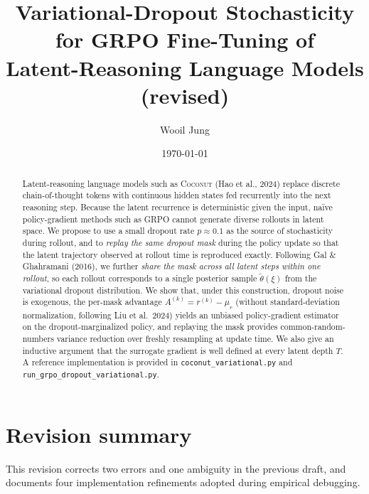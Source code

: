 \documentclass[11pt]{article}
\title{Variational-Dropout Stochasticity for GRPO Fine-Tuning of \\
       Latent-Reasoning Language Models \\[4pt]
       \large (revised)}
\author{Wooil Jung}
\date{\today}
\theoremstyle{definition}
\theoremstyle{remark}
\begin{document}
\maketitle

\begin{abstract}
Latent-reasoning language models such as \textsc{Coconut} (Hao et al., 2024)
replace discrete chain-of-thought tokens with continuous hidden states fed
recurrently into the next reasoning step.  Because the latent recurrence is
deterministic given the input, na\"ive policy-gradient methods such as GRPO
cannot generate diverse rollouts in latent space.  We propose to use a small
dropout rate $p \approx 0.1$ as the source of stochasticity during rollout, and
to \emph{replay the same dropout mask} during the policy update so that the
latent trajectory observed at rollout time is reproduced exactly.  Following
Gal \& Ghahramani (2016), we further \emph{share the mask across all latent
steps within one rollout}, so each rollout corresponds to a single posterior
sample $\tilde\theta(\xi)$ from the variational dropout distribution.  We show
that, under this construction, dropout noise is exogenous, the per-mask
advantage $A^{(k)} = r^{(k)} - \mu_r$ (without standard-deviation
normalization, following Liu et al.\ 2024) yields an unbiased policy-gradient
estimator on the dropout-marginalized policy, and replaying the mask provides
common-random-numbers variance reduction over freshly resampling at update
time.  We also give an inductive argument that the surrogate gradient is
well defined at every latent depth $T$.  A reference implementation is
provided in \texttt{coconut\_variational.py} and
\texttt{run\_grpo\_dropout\_variational.py}.
\end{abstract}

\section{Revision summary}

This revision corrects two errors and one ambiguity in the previous draft,
and documents four implementation refinements adopted during empirical
debugging.
\end{document}
